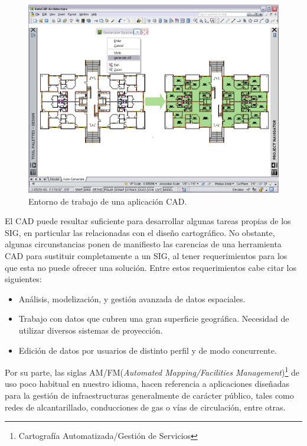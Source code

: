 \begin{figure}[!hbt]   
\centering
\includegraphics[width=.8\mycolumnwidth]{Introduccion_fundamentos/CAD.png}
\caption{\small Entorno de trabajo de una aplicación CAD.}
\label{Fig:CAD} 
\end{figure}

El CAD puede resultar suficiente para desarrollar algunas tareas propias de los SIG, en particular las relacionadas con el diseño cartográfico. No obstante, algunas circunstancias ponen de manifiesto las carencias de una herramienta CAD para sustituir completamente a un SIG, al tener requerimientos para los que esta no puede ofrecer una solución. Entre estos requerimientos cabe citar los siguientes:

\begin{itemize}
\item Análisis, modelización, y gestión avanzada de datos espaciales.
\item Trabajo con datos que cubren una gran superficie geográfica. Necesidad de utilizar diversos sistemas de proyección.
\item Edición de datos por usuarios de distinto perfil y de modo concurrente.
\end{itemize}

Por su parte, las siglas AM/FM(\emph{Automated Mapping/Facilities Management})\footnote{Cartografía Automatizada/Gestión de Servicios} de uso poco habitual en nuestro idioma, hacen referencia a aplicaciones diseñadas para la gestión de infraestructuras generalmente de carácter público, tales como redes de alcantarillado, conducciones de gas o vías de circulación, entre otras. 

